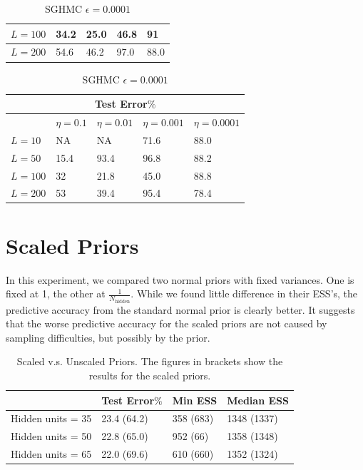 \documentclass[12pt]{report}
\begin{document}
\begin{table}[]
\begin{minipage}{0.5\linewidth}
\begin{tabular}{@{}lllll@{}}
$L =100$ & 34.2      & 25.0   & 46.8      & 91   \\ \midrule
$L=200 $ & 54.6      & 46.2     & 97.0      & 88.0   \\ \bottomrule
\end{tabular}
\caption{SGHMC $\epsilon = 0.001$}
\end{minipage}
\begin{minipage}{0.5\linewidth}
\centering
\footnotesize
\begin{tabular}{@{}lllll@{}}
\toprule
\multicolumn{5}{c}{Test Error$\%$}                  \\ \midrule
     & $\eta = 0.1 $ & $\eta = 0.01$ & $\eta = 0.001$ & $\eta =0.0001$ \\ \midrule
$L=10$  & NA       & NA     & 71.6      & 88.0    \\ \midrule
$L=50$  & 15.4      & 93.4    & 96.8     & 88.2  \\ \midrule
$L =100 $& 32      & 21.8   & 45.0      & 88.8   \\ \midrule
$L=200 $ & 53      & 39.4     & 95.4      & 78.4   \\ \bottomrule
\end{tabular}
\caption{SGHMC $\epsilon = 0.0001$}
\end{minipage}
\end{table}


\section{Scaled Priors}
In this experiment, we compared two normal priors with fixed variances. One is fixed at 1, the other at $\frac{1}{N_{\text{hidden}}}$. While we found little difference in their ESS's, the predictive accuracy from the standard normal prior is clearly better. It suggests that the worse predictive accuracy for the scaled priors are not caused by sampling difficulties, but possibly by the prior.

\begin{table}[]
\centering
\begin{tabular}{@{}llll@{}}
\toprule
            & Test Error$\%$ & Min ESS & Median ESS \\ \midrule
Hidden units = 35 & 23.4 (64.2)        & 358 (683)     & 1348 (1337)       \\ \midrule
Hidden units = 50 & 22.8 (65.0)        & 952 (66)      & 1358 (1348)         \\ \midrule
Hidden units = 65 & 22.0 (69.6)      & 610 (660)      & 1352 (1324)        \\ \bottomrule
\end{tabular}
\caption{Scaled v.s. Unscaled Priors. The figures in brackets show the results for the scaled priors.}

\end{table}
\end{document}
